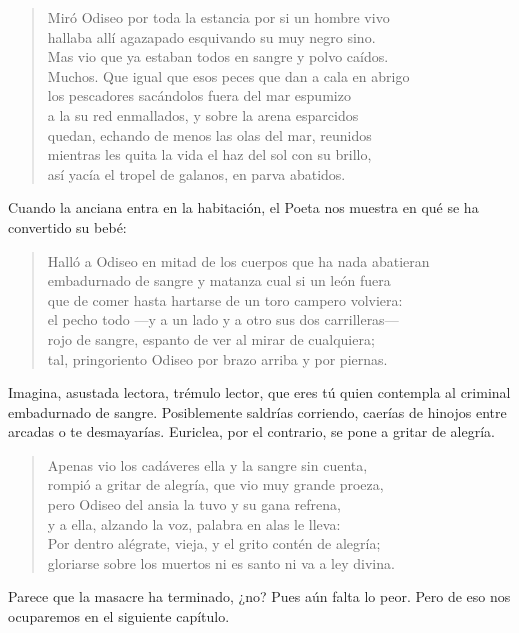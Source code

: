 \begin{verse}
Miró Odiseo por toda la estancia por si un hombre vivo\\
hallaba allí agazapado esquivando su muy negro sino.\\
Mas vio que ya estaban todos en sangre y polvo caídos.\\
Muchos. Que igual que esos peces que dan a cala en abrigo\\
los pescadores sacándolos fuera del mar espumizo\\
a la su red enmallados, y sobre la arena esparcidos\\
quedan, echando de menos las olas del mar, reunidos\\
mientras les quita la vida el haz del sol con su brillo,\\
así yacía el tropel de galanos, en parva abatidos.
\end{verse}

Cuando la anciana entra en la habitación, el Poeta nos muestra en qué se ha convertido su bebé:

\begin{verse}
Halló a Odiseo en mitad de los cuerpos que ha nada abatieran\\
embadurnado de sangre y matanza cual si un león fuera\\
que de comer hasta hartarse de un toro campero volviera:\\
el pecho todo ---y a un lado y a otro sus dos carrilleras---\\
rojo de sangre, espanto de ver al mirar de cualquiera;\\
tal, pringoriento Odiseo por brazo arriba y por piernas.
\end{verse}

Imagina, asustada lectora, trémulo lector, que eres tú quien contempla al criminal embadurnado de sangre. Posiblemente saldrías corriendo, caerías de hinojos entre arcadas o te desmayarías. Euriclea, por el contrario, se pone a gritar de alegría.

\begin{verse}
Apenas vio los cadáveres ella y la sangre sin cuenta,\\
rompió a gritar de alegría, que vio muy grande proeza,\\
pero Odiseo del ansia la tuvo y su gana refrena,\\
y a ella, alzando la voz, palabra en alas le lleva:\\
Por dentro alégrate, vieja, y el grito contén de alegría;\\
gloriarse sobre los muertos ni es santo ni va a ley divina.
\end{verse}

Parece que la masacre ha terminado, ¿no? Pues aún falta lo peor. Pero de eso nos ocuparemos en el siguiente capítulo.
